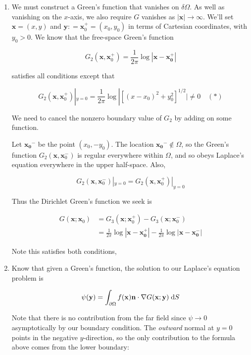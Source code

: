 \documentclass[a4paper]{article}
\begin{document}
\begin{enumerate}
	\item We must construct a Green's function that vanishes on $ \delta \Omega $. As well as vanishing on the $ x $-axis, we also require $ G $ vanishes as $ | \mathbf{x} | \to \infty $. We'll set $ \mathbf{x} = (x,y) $ and $ \mathbf{y} : = \mathbf{x}_{0}^{+} = (x_{0},y_{0}) $ in terms of Cartesian coordinates, with $ y_{0} > 0 $. We know that the free-space Green's function
	
	\[ G_{2}(\mathbf{x},\mathbf{x}_{0}^{+}) = \frac{1}{2\pi} \log |  \mathbf{x} - \mathbf{x_{0}^{+}} | \]
	
	satisfies all conditions except that
	
		\[ G_{2}(\mathbf{x},\mathbf{x}_{0}^{+}) |_{y = 0} = \frac{1}{2\pi} \log | [ (x - x_{0})^{2} + y_{0}^{2} ]^{1/2} | \neq 0 \quad (*)  \]
		
	We need to cancel the nonzero boundary value of $ G_{2} $ by adding on some function.
	
	Let $ \mathbf{x_{0}}^{-} $ be the point $ (x_{0},-y_{0}) $. The location $ \mathbf{x_{0}}^{-} \notin \Omega $, so the Green's function $ G_{2}(\mathbf{x},\mathbf{x}_{0}^{-}) $ is regular everywhere within $ \Omega $, and so obeys Laplace's equation everywhere in the upper half-space. Also,
	
	\[ G_{2}(\mathbf{x},\mathbf{x}_{0}^{-}) |_{y = 0} = G_{2}(\mathbf{x},\mathbf{x}_{0}^{+}) |_{y = 0} \]
	
	Thus the Dirichlet Green's function we seek is 
	
	\begin{align*}
	G(\mathbf{x} ; \mathbf{x}_{0} )& = G_{3} (\mathbf{x} ; \mathbf{x}_{0}^{+}) - G_{3} (\mathbf{x} ; \mathbf{x}_{0}^{-})   \\
	& =  \frac{1}{2\pi} \log |  \mathbf{x} - \mathbf{x_{0}^{+}} | -  \frac{1}{2\pi} \log |  \mathbf{x} - \mathbf{x_{0}^{-}} |
	\end{align*}
	
	Note this satisfies both conditions,
	
	\item Know that given a Green's function, the solution to our Laplace's equation problem is
	
	\[ \psi(\mathbf{y}) = \int_{\partial \Omega} f(\mathbf{x}) \mathbf{n} \cdot \nabla G(\mathbf{x} ; \mathbf{y}) \; \mathrm{d} S  \]
	
	
	Note that there is no contribution from the far field since $ \psi \to 0 $ asymptotically by our boundary condition. The \emph{outward} normal at $ y = 0 $ points in the negative $ y $-direction, so the only contribution to the formula above comes from the lower boundary:
	

\end{enumerate}
\end{document}
